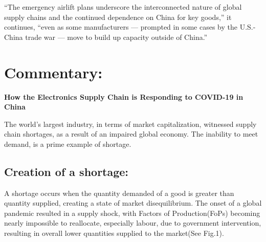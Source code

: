 \documentclass[11pt, a4paper]{article}
\begin{document}
			“The emergency airlift plans underscore the interconnected nature of global supply chains and the continued dependence on China for key goods,” it continues, “even as some manufacturers — prompted in some cases by the U.S.-China trade war — move to build up capacity outside of China.”

		\newpage

	\section{Commentary:}
		\begin{center}
			\textbf{\Large How the Electronics Supply Chain is Responding to COVID-19 in China}
		\end{center}
		
		The world's largest industry, in terms of market capitalization, witnessed supply chain shortages, as a result of an impaired global economy. The inability to meet demand, is a prime example of shortage.

		\subsection{Creation of a shortage:}
			A shortage occurs when the quantity demanded of a good is greater than quantity supplied, creating a state of market disequilibrium. The onset of a global pandemic resulted in a supply shock, with Factors of Production(FoPs) becoming nearly impossible to reallocate, especially labour, due to government intervention, resulting in overall lower quantities supplied to the market(See Fig.1).
\end{document}
